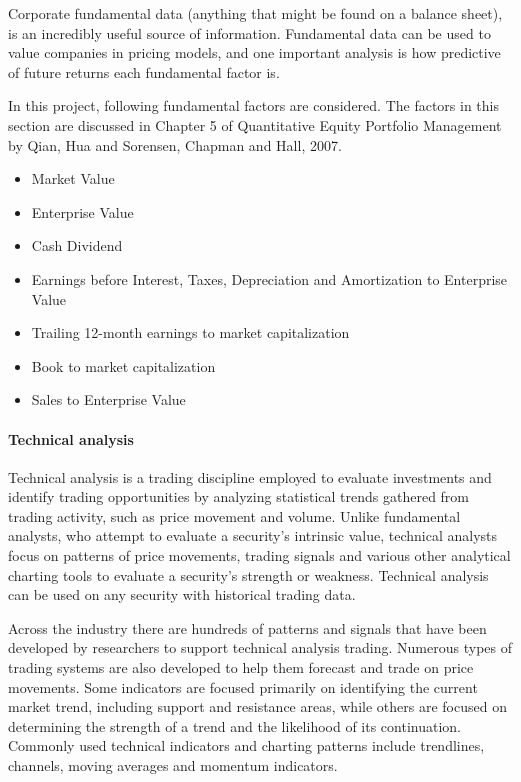 \documentclass[]{article}
\providecommand{\tightlist}{%
  \setlength{\itemsep}{0pt}\setlength{\parskip}{0pt}}
\let\oldparagraph\paragraph
\renewcommand{\paragraph}[1]{\oldparagraph{#1}\mbox{}}
\begin{document}
Corporate fundamental data (anything that might be found on a balance
sheet), is an incredibly useful source of information. Fundamental data
can be used to value companies in pricing models, and one important
analysis is how predictive of future returns each fundamental factor is.

In this project, following fundamental factors are considered. The
factors in this section are discussed in Chapter 5 of Quantitative
Equity Portfolio Management by Qian, Hua and Sorensen, Chapman and Hall,
2007.

\begin{itemize}
\tightlist
\item
  Market Value
\item
  Enterprise Value
\item
  Cash Dividend
\item
  Earnings before Interest, Taxes, Depreciation and Amortization to
  Enterprise Value
\item
  Trailing 12-month earnings to market capitalization
\item
  Book to market capitalization
\item
  Sales to Enterprise Value
\end{itemize}

\hypertarget{technical-analysis}{%
\paragraph{Technical analysis}\label{technical-analysis}}

Technical analysis is a trading discipline employed to evaluate
investments and identify trading opportunities by analyzing statistical
trends gathered from trading activity, such as price movement and
volume. Unlike fundamental analysts, who attempt to evaluate a
security's intrinsic value, technical analysts focus on patterns of
price movements, trading signals and various other analytical charting
tools to evaluate a security's strength or weakness. Technical analysis
can be used on any security with historical trading data.

Across the industry there are hundreds of patterns and signals that have
been developed by researchers to support technical analysis trading.
Numerous types of trading systems are also developed to help them
forecast and trade on price movements. Some indicators are focused
primarily on identifying the current market trend, including support and
resistance areas, while others are focused on determining the strength
of a trend and the likelihood of its continuation. Commonly used
technical indicators and charting patterns include trendlines, channels,
moving averages and momentum indicators.
\end{document}
